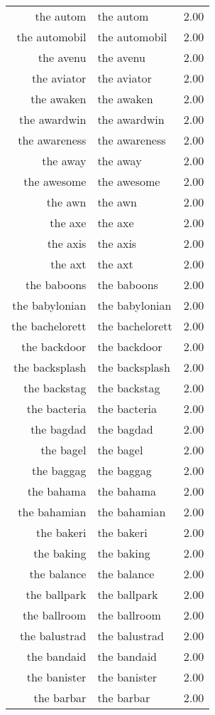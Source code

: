\begin{table}[ht]
\begin{tabular}{rlr}
  the autom & the autom & 2.00 \\ 
  the automobil & the automobil & 2.00 \\ 
  the avenu & the avenu & 2.00 \\ 
  the aviator & the aviator & 2.00 \\ 
  the awaken & the awaken & 2.00 \\ 
  the awardwin & the awardwin & 2.00 \\ 
  the awareness & the awareness & 2.00 \\ 
  the away & the away & 2.00 \\ 
  the awesome & the awesome & 2.00 \\ 
  the awn & the awn & 2.00 \\ 
  the axe & the axe & 2.00 \\ 
  the axis & the axis & 2.00 \\ 
  the axt & the axt & 2.00 \\ 
  the baboons & the baboons & 2.00 \\ 
  the babylonian & the babylonian & 2.00 \\ 
  the bachelorett & the bachelorett & 2.00 \\ 
  the backdoor & the backdoor & 2.00 \\ 
  the backsplash & the backsplash & 2.00 \\ 
  the backstag & the backstag & 2.00 \\ 
  the bacteria & the bacteria & 2.00 \\ 
  the bagdad & the bagdad & 2.00 \\ 
  the bagel & the bagel & 2.00 \\ 
  the baggag & the baggag & 2.00 \\ 
  the bahama & the bahama & 2.00 \\ 
  the bahamian & the bahamian & 2.00 \\ 
  the bakeri & the bakeri & 2.00 \\ 
  the baking & the baking & 2.00 \\ 
  the balance & the balance & 2.00 \\ 
  the ballpark & the ballpark & 2.00 \\ 
  the ballroom & the ballroom & 2.00 \\ 
  the balustrad & the balustrad & 2.00 \\ 
  the bandaid & the bandaid & 2.00 \\ 
  the banister & the banister & 2.00 \\ 
  the barbar & the barbar & 2.00 \\ 

\end{tabular}
\end{table}
